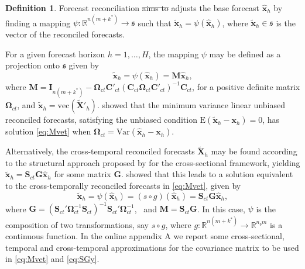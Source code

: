 \documentclass[review, 11pt]{elsarticle}
\newcommand{\xvet}{\bm{x}}
\newcommand{\Cvet}{\bm{C}}
\newcommand{\Gvet}{\bm{G}}
\newcommand{\Ivet}{\bm{I}}
\newcommand{\Mvet}{\bm{M}}
\newcommand{\Svet}{\bm{S}}
\newcommand{\Xvet}{\bm{X}}
\newcommand{\Omegavet}{\bm{\Omega}}
\theoremstyle{definition}
\newtheorem{definition}{Definition}[section]
\begin{document}
\begin{definition}
	Forecast reconciliation {\color{red}\sout{aims to}} adjust{\color{blue}s} the base forecast $\widehat{\xvet}_{h}$ by finding a mapping $\psi: \mathbb{R}^{n(m+k^\ast)} \rightarrow \mathfrak{s}$ such that $\widetilde{\xvet}_{h} = \psi\left(\widehat{\xvet}_{h}\right)$, where $\widetilde{\xvet}_{h} \in \mathfrak{s}$ is the vector of the reconciled forecasts.
\end{definition}

For a given forecast horizon $h = 1,\dots, H$, the mapping $\psi$ may be defined as a projection onto $\mathfrak{s}$ given by \citep{panagiotelis2021, difonzo2023}
\begin{equation}
	\label{eq:Mvet}
	\widetilde{\xvet}_{h} = \psi\left(\widehat{\xvet}_h\right) = \Mvet \widehat{\xvet}_h,
\end{equation}
where $\Mvet = \Ivet_{n(m+ k^\ast)} - \Omegavet_{ct}\Cvet'_{ct}\left(\Cvet_{ct}\Omegavet_{ct}\Cvet'_{ct}\right)^{-1}\Cvet_{ct}$, for a positive definite matrix $\Omegavet_{ct}$, and $\widetilde{\xvet}_{h} = \mathrm{vec}(\widetilde{\Xvet}'_{h})$.
\citet{wickramasuriya2019} showed that the minimum variance linear unbiased reconciled forecasts, satisfying the unbiased condition $\text{E}(\widetilde{\xvet}_h -\xvet_h) = 0$, has solution \eqref{eq:Mvet} when $\Omegavet_{ct} = \text{Var}(\widehat{\xvet}_h -\xvet_h)$.

Alternatively, the cross-temporal reconciled forecasts $\widetilde{\Xvet}_{h}$ may be found according to the structural approach proposed by \cite{hyndman2011} for the cross-sectional framework, yielding $\widetilde{\xvet}_h = \Svet_{ct}\Gvet \widehat{\xvet}_h$ for some matrix $\Gvet$. \citet{wickramasuriya2019} showed that this leads to a solution equivalent to the cross-temporally reconciled forecasts in \eqref{eq:Mvet}, given by
\begin{equation}\label{eq:SGy}
	\widetilde{\xvet}_{h} = \psi\left(\widehat{\xvet}_h \right) = \left(s \circ g \right)\left(\widehat{\xvet}_h\right)=\Svet_{ct}\Gvet \widehat{\xvet}_{h},
\end{equation}
where $\Gvet = (\Svet_{ct}' \Omegavet_{ct}^{-1}\Svet_{ct})^{-1} \Svet_{ct}'\Omegavet_{ct}^{-1}$,~ and $\Mvet = \Svet_{ct} \Gvet$. In this case, $\psi$ is the composition of two transformations, say $s \circ g$, where $g: \mathbb{R}^{n(m+k^\ast)} \rightarrow \mathbb{R}^{n_b m}$ is a continuous function. In the online appendix A we report some cross-sectional, temporal and cross-temporal approximations for the covariance matrix to be used in \eqref{eq:Mvet} and \eqref{eq:SGy}.
\end{document}
